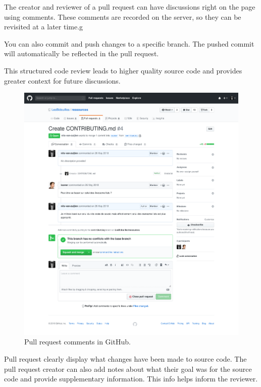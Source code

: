 \documentclass[10pt,a4paper,english]{report}
\begin{document}
    The creator and reviewer of a pull request can have discussions right on the page using comments. These comments are recorded on the server, so they can be revisited at a later time.g

    You can also commit and push changes to a specific branch. The pushed commit will automatically be reflected in the pull request.

    This structured code review leads to higher quality source code and provides greater context for future discussions.

    \begin{figure}[htp]
    \begin{center}
    \includegraphics[scale=0.3]{images/pull_requests_003.png}
    \end{center}
    \caption{Pull request comments in GitHub.}
    \end{figure}

    Pull request clearly display what changes have been made to source code. The pull request creator can also add notes about what their goal was for the source code and provide supplementary information. This info helps inform the reviewer.
\end{document}
